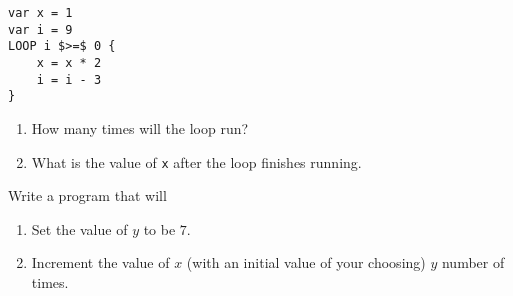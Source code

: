 \documentclass{article}
\begin{document}
\begin{Exercise}
\begin{lstlisting}[caption={Pseudocode.}, label={code:exercise_loop_2},mathescape]
var x = 1
var i = 9
LOOP i $>=$ 0 {
    x = x * 2
    i = i - 3
}
\end{lstlisting}

\begin{enumerate}
\item How many times will the loop run?
\item What is the value of \lstinline{x} after the loop finishes running.
\end{enumerate}
\end{Exercise}

\begin{Exercise}

Write a program that will
\begin{enumerate}
\item Set the value of $y$ to be $7$.
\item Increment the value of $x$ (with an initial value of your choosing) $y$ number of times.
\end{enumerate}

\end{Exercise}
\end{document}
